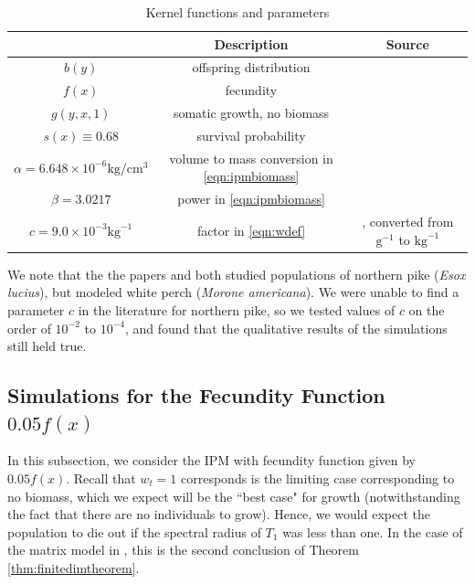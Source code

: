 \begin{table}[h!]
	\begin{center}
		\caption{Kernel functions and parameters}
		\label{tab:funcsandparams}
		\begin{tabular}{|c|c|c|}
			\hline
			 & \textbf{Description} & \textbf{Source}\\
			\hline \hline
			$b(y)$ & offspring distribution & \cite{Vindenes2014} \\
			$f(x)$ & fecundity & \cite{Vindenes2014} \\
			$g(y, x, 1)$ & somatic growth, no biomass & \cite{Vindenes2014} \\
			$s(x) \equiv 0.68$ & survival probability & \cite{Vindenes2014} \\
			$\alpha = 6.648 \times 10^{-6} \text{kg}/\text{cm}^3$ & volume to mass conversion in \eqref{eqn:ipmbiomass} & \cite{Milardi2014} \\
			$\beta = 3.0217$ & power in \eqref{eqn:ipmbiomass} & \cite{Milardi2014} \\
			$c = 9.0 \times 10^{-3} \text{kg}^{-1}$ & factor in \eqref{eqn:wdef} & \cite{Chizinski2010}, converted from $\text{g}^{-1}$ to $\text{kg}^{-1}$ \\
			\hline
		\end{tabular}
	\end{center}
\end{table}

We note that the the papers \cite{Vindenes2014} and \cite{Milardi2014} both studied populations of northern pike (\emph{Esox lucius}), but \cite{Chizinski2010} modeled white perch (\emph{Morone americana}). We were unable to find a parameter $c$ in the literature for northern pike, so we tested values of $c$ on the order of $10^{-2}$ to $10^{-4}$, and found that the qualitative results of the simulations still held true.

\subsection{Simulations for the Fecundity Function $0.05f(x)$} \label{subsec:0.05f(x)}

In this subsection, we consider the IPM with fecundity function given by $0.05f(x)$. Recall that $w_t = 1$ corresponds is the limiting case corresponding to no biomass, which we expect will be the ``best case" for growth (notwithstanding the fact that there are no individuals to grow). Hence, we would expect the population to die out if the spectral radius of $T_1$ was less than one. In the case of the matrix model in \cite{Callahan2019}, this is the second conclusion of Theorem \ref{thm:finitedimtheorem}.

